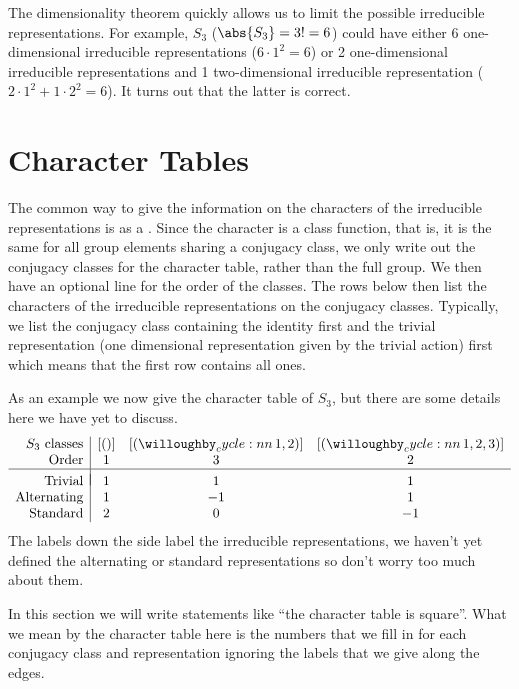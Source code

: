 The dimensionality theorem quickly allows us to limit the possible
irreducible representations.
For example, \(S_3\) (\(\abs{S_3} = 3! = 6\)) could have either 6
one-dimensional irreducible representations (\(6 \cdot 1^2 = 6\)) or 2
one-dimensional irreducible representations and 1 two-dimensional irreducible
representation (\(2 \cdot 1^2 + 1\cdot 2^2 = 6\)).
It turns out that the latter is correct.

\section{Character Tables}
The common way to give the information on the characters of the irreducible
representations is as a .
Since the character is a class function, that is, it is the same for all
group elements sharing a conjugacy class, we only write out the conjugacy
classes for the character table, rather than the full group.
We then have an optional line for the order of the classes.
The rows below then list the characters of the irreducible representations
on the conjugacy classes.
Typically, we list the conjugacy class containing the identity first and the
trivial representation (one dimensional representation given by the trivial
action) first which means that the first row contains all ones.

As an example we now give the character table of \(S_3\), but there are some
details here we have yet to discuss.
\begin{equation}
    \begin{array}{r|ccc}
        S_3\text{ classes} & [()] & [\cycle{1,2}] & [\cycle{1,2,3}] \\
        \text{Order} & 1 & 3 & 2 \\ \hline 
        & & & \\[-2ex]
        \text{Trivial} & 1 & 1 & 1 \\
        \text{Alternating} & 1 & -1 & 1 \\
        \text{Standard} & 2 & 0 & -1 \\
    \end{array}
\end{equation}
The labels down the side label the irreducible representations, we haven't
yet defined the alternating or standard representations so don't worry too much
about them.

In this section we will write statements like \enquote{the character table
    is square}.
What we mean by the character table here is the numbers that we fill in for
each conjugacy class and representation ignoring the labels that we give along
the edges.

